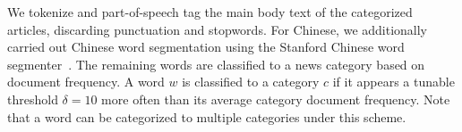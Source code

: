 \begin{CJK}{UTF8}{gbsn}
We tokenize and part-of-speech tag the main body text of the
categorized articles, discarding punctuation and stopwords.  For
Chinese, we additionally carried out Chinese word segmentation using
the Stanford Chinese word segmenter~\cite{Chang2008}. The remaining
words are classified to a news category based on document frequency. A
word $w$ is classified to a category $c$ if it appears a tunable
threshold $\delta=10$ more often than its average category document
frequency.  Note that a word can be categorized to multiple categories
under this scheme.








\end{CJK}

